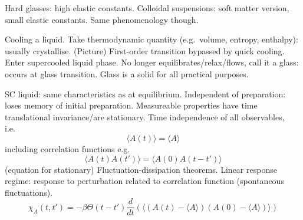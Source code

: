 \documentclass[11pt,twoside]{report}
\def\includebibliography{}
\begin{document}
Hard glasses: high elastic constants.
Colloidal suspensions: soft matter version, small elastic constants.
Same phenomenology though.

Cooling a liquid.
Take thermodynamic quantity (e.g.\ volume, entropy, enthalpy): usually crystallise.
(Picture)
First-order transition bypassed by quick cooling.
Enter supercooled liquid phase.
No longer equilibrates/relax/flows, call it a glass: occurs at glass transition.
Glass is a solid for all practical purposes.

SC liquid: same characteristics as at equilibrium.
Independent of preparation: loses memory of initial preparation.
Measureable properties have time translational invariance/are stationary.
Time independence of all observables, i.e.\
\begin{equation}
  \langle A(t) \rangle = \langle A \rangle
\end{equation}
including correlation functions e.g.\
\begin{equation}
  \langle A(t) A(t') \rangle = \langle A(0) A(t - t') \rangle
\end{equation}
(equation for stationary)
Fluctuation-dissipation theorems.
Linear response regime: response to perturbation related to correlation function (spontaneous fluctuations).
\begin{equation}
  \chi_A (t, t')
  =
  - \beta \Theta(t - t')
  \frac{d}{dt}
  \left(
  \bigg\langle
  (A(t) - \langle A \rangle)
  (A(0) - \langle A \rangle)
  \bigg\rangle
  \right)
\end{equation}

\ifdefined\includebibliography
  \printbibliography
\fi
\end{document}

